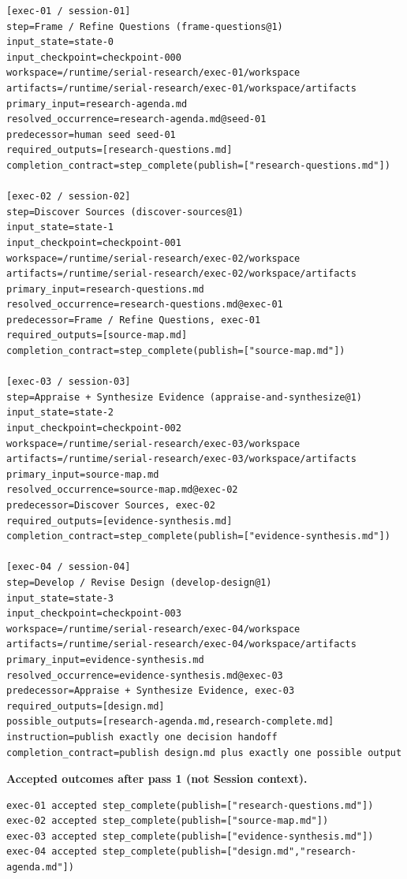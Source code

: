 \documentclass[11pt]{article}
\begin{document}
\begin{lstlisting}[style=playbook,basicstyle=\ttfamily\tiny]
[exec-01 / session-01]
step=Frame / Refine Questions (frame-questions@1)
input_state=state-0
input_checkpoint=checkpoint-000
workspace=/runtime/serial-research/exec-01/workspace
artifacts=/runtime/serial-research/exec-01/workspace/artifacts
primary_input=research-agenda.md
resolved_occurrence=research-agenda.md@seed-01
predecessor=human seed seed-01
required_outputs=[research-questions.md]
completion_contract=step_complete(publish=["research-questions.md"])

[exec-02 / session-02]
step=Discover Sources (discover-sources@1)
input_state=state-1
input_checkpoint=checkpoint-001
workspace=/runtime/serial-research/exec-02/workspace
artifacts=/runtime/serial-research/exec-02/workspace/artifacts
primary_input=research-questions.md
resolved_occurrence=research-questions.md@exec-01
predecessor=Frame / Refine Questions, exec-01
required_outputs=[source-map.md]
completion_contract=step_complete(publish=["source-map.md"])

[exec-03 / session-03]
step=Appraise + Synthesize Evidence (appraise-and-synthesize@1)
input_state=state-2
input_checkpoint=checkpoint-002
workspace=/runtime/serial-research/exec-03/workspace
artifacts=/runtime/serial-research/exec-03/workspace/artifacts
primary_input=source-map.md
resolved_occurrence=source-map.md@exec-02
predecessor=Discover Sources, exec-02
required_outputs=[evidence-synthesis.md]
completion_contract=step_complete(publish=["evidence-synthesis.md"])

[exec-04 / session-04]
step=Develop / Revise Design (develop-design@1)
input_state=state-3
input_checkpoint=checkpoint-003
workspace=/runtime/serial-research/exec-04/workspace
artifacts=/runtime/serial-research/exec-04/workspace/artifacts
primary_input=evidence-synthesis.md
resolved_occurrence=evidence-synthesis.md@exec-03
predecessor=Appraise + Synthesize Evidence, exec-03
required_outputs=[design.md]
possible_outputs=[research-agenda.md,research-complete.md]
instruction=publish exactly one decision handoff
completion_contract=publish design.md plus exactly one possible output
\end{lstlisting}

\noindent\textbf{Accepted outcomes after pass 1 (not Session context).}
\begin{lstlisting}[style=playbook,basicstyle=\ttfamily\scriptsize]
exec-01 accepted step_complete(publish=["research-questions.md"])
exec-02 accepted step_complete(publish=["source-map.md"])
exec-03 accepted step_complete(publish=["evidence-synthesis.md"])
exec-04 accepted step_complete(publish=["design.md","research-agenda.md"])
\end{lstlisting}
\end{document}
